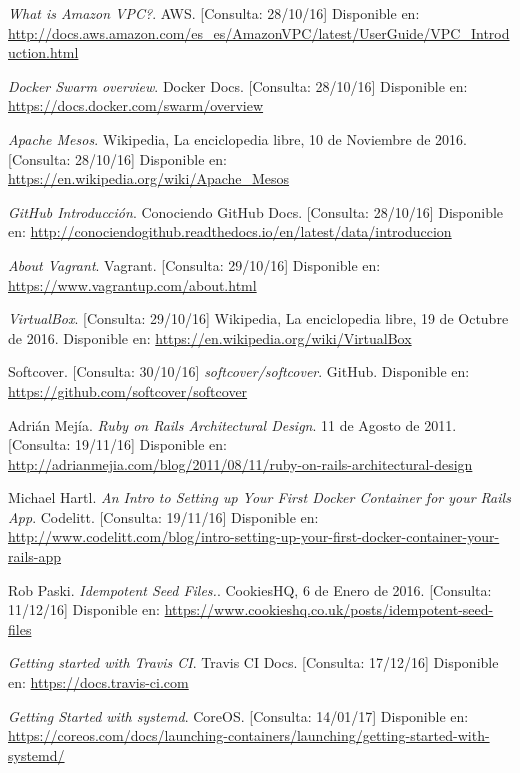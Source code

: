 \begin{thebibliography}{9}
\textit{What is Amazon VPC?}. 
AWS. [Consulta: 28/10/16]
Disponible en: \url{http://docs.aws.amazon.com/es_es/AmazonVPC/latest/UserGuide/VPC_Introduction.html}

\textit{Docker Swarm overview}. 
Docker Docs. [Consulta: 28/10/16]
Disponible en: \url{https://docs.docker.com/swarm/overview}

\textit{Apache Mesos}. 
Wikipedia, La enciclopedia libre, 10 de Noviembre de 2016. [Consulta: 28/10/16]
Disponible en: \url{https://en.wikipedia.org/wiki/Apache\_Mesos}

\textit{GitHub Introducción}. 
Conociendo GitHub Docs. [Consulta: 28/10/16]
Disponible en: \url{http://conociendogithub.readthedocs.io/en/latest/data/introduccion}

\textit{About Vagrant}. 
Vagrant. [Consulta: 29/10/16]
Disponible en: \url{https://www.vagrantup.com/about.html}

\textit{VirtualBox}. [Consulta: 29/10/16]
Wikipedia, La enciclopedia libre, 19 de Octubre de 2016.
Disponible en: \url{https://en.wikipedia.org/wiki/VirtualBox}

Softcover. [Consulta: 30/10/16]
\textit{softcover/softcover}. GitHub.
Disponible en: \url{https://github.com/softcover/softcover}

Adrián Mejía.
\textit{Ruby on Rails Architectural Design}. 
11 de Agosto de 2011. [Consulta: 19/11/16]
Disponible en: \url{http://adrianmejia.com/blog/2011/08/11/ruby-on-rails-architectural-design}

Michael Hartl.
\textit{An Intro to Setting up Your First Docker Container for your Rails App}. 
Codelitt. [Consulta: 19/11/16]
Disponible en: \url{http://www.codelitt.com/blog/intro-setting-up-your-first-docker-container-your-rails-app}

Rob Paski.
\textit{Idempotent Seed Files.}. 
CookiesHQ, 6 de Enero de 2016. [Consulta: 11/12/16]
Disponible en: \url{https://www.cookieshq.co.uk/posts/idempotent-seed-files}

\textit{Getting started with Travis CI}. 
Travis CI Docs. [Consulta: 17/12/16]
Disponible en: \url{https://docs.travis-ci.com}

\textit{Getting Started with systemd}. 
CoreOS. [Consulta: 14/01/17]
Disponible en: \url{https://coreos.com/docs/launching-containers/launching/getting-started-with-systemd/}


\end{thebibliography}
